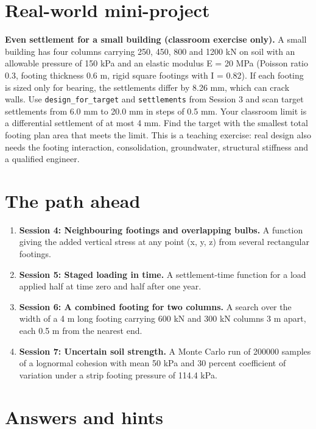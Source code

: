 \documentclass[11pt,a4paper]{article}
\begin{document}
\section{Real-world mini-project}
\textbf{Even settlement for a small building (classroom exercise only).} A small building has four columns carrying 250, 450, 800 and 1200 kN on soil with an allowable pressure of 150 kPa and an elastic modulus E = 20 MPa (Poisson ratio 0.3, footing thickness 0.6 m, rigid square footings with I = 0.82). If each footing is sized only for bearing, the settlements differ by 8.26 mm, which can crack walls. Use \texttt{design\_for\_target} and \texttt{settlements} from Session 3 and scan target settlements from 6.0 mm to 20.0 mm in steps of 0.5 mm. Your classroom limit is a differential settlement of at most 4 mm. Find the target with the smallest total footing plan area that meets the limit. This is a teaching exercise: real design also needs the footing interaction, consolidation, groundwater, structural stiffness and a qualified engineer.

\section{The path ahead}
\begin{enumerate}[nosep]
\item \textbf{Session 4: Neighbouring footings and overlapping bulbs.} A function giving the added vertical stress at any point (x, y, z) from several rectangular footings.
\item \textbf{Session 5: Staged loading in time.} A settlement-time function for a load applied half at time zero and half after one year.
\item \textbf{Session 6: A combined footing for two columns.} A search over the width of a 4 m long footing carrying 600 kN and 300 kN columns 3 m apart, each 0.5 m from the nearest end.
\item \textbf{Session 7: Uncertain soil strength.} A Monte Carlo run of 200000 samples of a lognormal cohesion with mean 50 kPa and 30 percent coefficient of variation under a strip footing pressure of 114.4 kPa.
\end{enumerate}

\section{Answers and hints}
\end{document}

